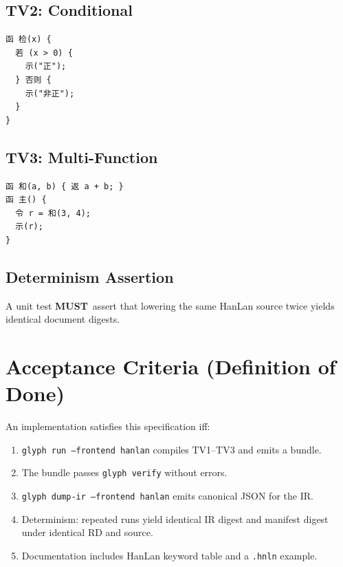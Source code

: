 \documentclass[12pt]{article}
\newcommand{\MUST}{\textbf{MUST}}
\begin{document}
\subsection{TV2: Conditional}
\begin{verbatim}
函 检(x) {
  若 (x > 0) {
    示("正");
  } 否则 {
    示("非正");
  }
}
\end{verbatim}

\subsection{TV3: Multi-Function}
\begin{verbatim}
函 和(a, b) { 返 a + b; }
函 主() {
  令 r = 和(3, 4);
  示(r);
}
\end{verbatim}

\subsection{Determinism Assertion}
A unit test \MUST\ assert that lowering the same HanLan source twice yields identical document digests.

\section{Acceptance Criteria (Definition of Done)}
An implementation satisfies this specification iff:
\begin{enumerate}[leftmargin=1.5em]
  \item \texttt{glyph run --frontend hanlan} compiles TV1--TV3 and emits a bundle.
  \item The bundle passes \texttt{glyph verify} without errors.
  \item \texttt{glyph dump-ir --frontend hanlan} emits canonical JSON for the IR.
  \item Determinism: repeated runs yield identical IR digest and manifest digest under identical RD and source.
  \item Documentation includes HanLan keyword table and a \texttt{.hnln} example.
\end{enumerate}
\end{document}
